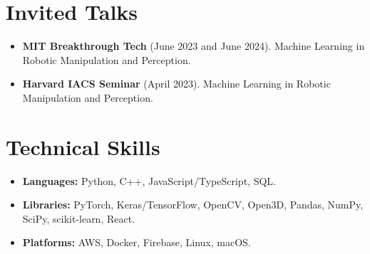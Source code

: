 \documentclass[a4paper,11pt]{article}
\newcommand{\resumeItem}[1]{
  \item\small{#1}
}
\newcommand{\resumeItemListStart}{
  \begin{itemize}[rightmargin=0.11in, itemsep=1.5pt, topsep=4pt, parsep=0pt, partopsep=0pt]
}
\newcommand{\resumeItemListEnd}{\end{itemize}}
\begin{document}
\section{Invited Talks}
\resumeItemListStart
      \resumeItem{\textbf{MIT Breakthrough Tech} (June 2023 and June 2024). Machine Learning in Robotic Manipulation and Perception.}
      \resumeItem{\textbf{Harvard IACS Seminar} (April 2023). Machine Learning in Robotic Manipulation and Perception.}
\resumeItemListEnd

\section{Technical Skills}
\resumeItemListStart
      \resumeItem{\textbf{Languages:} Python, C++, JavaScript/TypeScript, SQL.}
      \resumeItem{\textbf{Libraries:} PyTorch, Keras/TensorFlow, OpenCV, Open3D, Pandas, NumPy, SciPy, scikit-learn, React.}
      \resumeItem{\textbf{Platforms:} AWS, Docker, Firebase, Linux, macOS.}
\resumeItemListEnd
\end{document}
